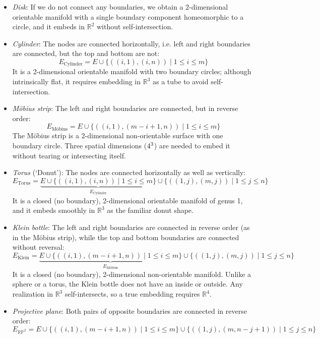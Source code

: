 \begin{itemize}[leftmargin=1em]
\item \emph{Disk}: If we do not connect any boundaries, we obtain a 2-dimensional orientable manifold with a single boundary component homeomorphic to a circle, and it embeds in \(\mathbb{R}^2\) without self-intersection.
\item \emph{Cylinder}: The nodes are connected horizontally, i.e. left and right boundaries are connected, but the top and bottom are not:
\[
E_{\text{Cylinder}} = E \cup \{((i,1),(i,n)) \mid 1\leq i\leq m\}
\]
It is a 2-dimensional orientable manifold with two boundary circles; although intrinsically flat, it requires embedding in \(\mathbb{R}^3\) as a tube to avoid self-intersection.
\item \emph{Möbius strip}: The left and right boundaries are connected, but in reverse order:
\[
E_{\text{Möbius}} = E \cup \{((i,1),(m-i+1,n)) \mid 1\leq i\leq m\}
\]
The Möbius strip is a 2-dimensional non-orientable surface with one boundary circle.
Three spatial dimensions (\(4^3\)) are needed to embed it without tearing or intersecting itself.
\item \emph{Torus} (`Donut'): The nodes are connected horizontally as well as vertically:
\[
E_{\text{Torus}} = \underbrace{E \cup \{((i,1),(i,n)) \mid 1\leq i\leq m\}}_{E_{\text{Cylinder}}} \cup \{((1,j),(m,j)) \mid 1\leq j\leq n\}
\]
It is a closed (no boundary), 2-dimensional orientable manifold of genus 1, and it embeds smoothly in \(\mathbb{R}^3\) as the familiar donut shape.
\item \emph{Klein bottle}: The left and right boundaries are connected in reverse order (as in the Möbius strip), while the top and bottom boundaries are connected without reversal:
\[
E_{\text{Klein}} = \underbrace{E \cup \{((i,1),(m-i+1,n)) \mid 1\leq i\leq m\}}_{E_{\text{Möbius}}} \cup \{((1,j),(m,j)) \mid 1\leq j\leq n\}
\]
It is a closed (no boundary), 2-dimensional non-orientable manifold. 
Unlike a sphere or a torus, the Klein bottle does not have an inside or outside.
Any realization in \(\mathbb{R}^3\) self-intersects, so a true embedding requires \(\mathbb{R}^4\).
\item \emph{Projective plane}: Both pairs of opposite boundaries are connected in reverse order:
\[
E_{\mathbb{RP}^{2}} = E \cup \{((i,1),(m-i+1,n)) \mid 1\leq i\leq m\} \cup \{((1,j),(m,n-j+1)) \mid 1\leq j\leq n\}
\]
\end{itemize}

